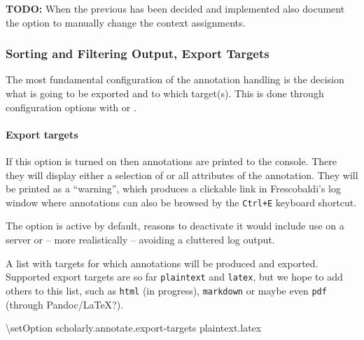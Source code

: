 \documentclass[]{ollmanual}
\newenvironment{Shaded}{}{}
\newcommand{\FunctionTok}[1]{\textcolor[rgb]{0.02,0.16,0.49}{#1}}
\newcommand{\NormalTok}[1]{#1}
\let\oldparagraph\paragraph
\renewcommand{\paragraph}[1]{\oldparagraph{#1}\mbox{}}
\begin{document}
\textbf{TODO:} When the previous has been decided and implemented also
document the option to manually change the context assignments.

\hypertarget{sorting-and-filtering-output-export-targets}{%
\subsubsection{Sorting and Filtering Output, Export
Targets}\label{sorting-and-filtering-output-export-targets}}

The most fundamental configuration of the annotation handling is the
decision what is going to be exported and to which target(s). This is
done through configuration options with
 or
.

\hypertarget{export-targets}{%
\paragraph{Export targets}\label{export-targets}}


If this option is turned on then annotations are printed to the console.
There they will display either a selection of or all attributes of the
annotation. They will be printed as a ``warning'', which produces a
clickable link in Frescobaldi's log window where annotations can also be
browsed by the \texttt{Ctrl+E} keyboard shortcut.

The option is active by default, reasons to deactivate it would include
use on a server or -- more realistically -- avoiding a cluttered log
output.


A list with targets for which annotations will be produced and exported.
Supported export targets are so far \texttt{plaintext} and
\texttt{latex}, but we hope to add others to this list, such as
\texttt{html} (in progress), \texttt{markdown} or maybe even
\texttt{pdf} (through Pandoc/\LaTeX?).

\begin{Shaded}
\begin{Highlighting}[]
\FunctionTok{\textbackslash{}setOption}\NormalTok{ scholarly.annotate.export-targets plaintext.latex}
\end{Highlighting}
\end{Shaded}
\end{document}
